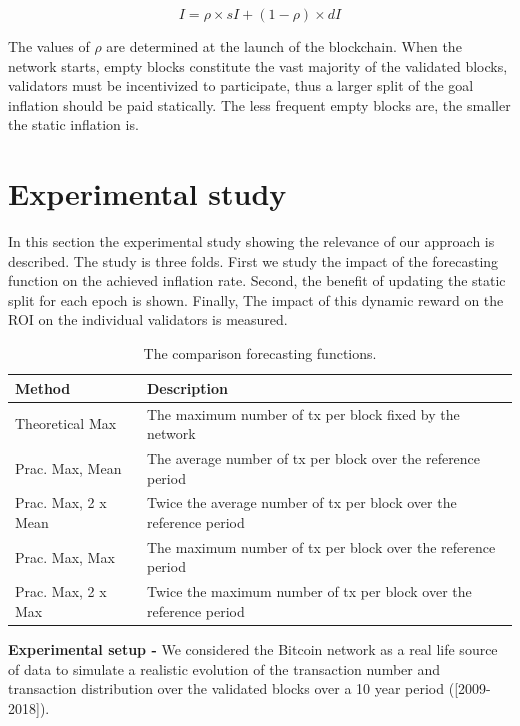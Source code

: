 \documentclass[conference]{IEEEtran}
\begin{document}
\begin{equation}
    I=\rho \times sI + (1 - \rho) \times dI
    \label{eq:inflationsplitRho}
\end{equation}

The values of $\rho$ are determined at the launch of the blockchain. When the network starts, empty blocks constitute the vast majority of the validated blocks, validators must be incentivized to participate, thus a larger split of the goal inflation should be paid statically. The less frequent empty blocks are, the smaller the static inflation is.

\section{Experimental study}
\label{sec:experiements}
In this section the experimental study showing the relevance of our approach is described. The study is three folds. First we study the impact of the forecasting function on the achieved inflation rate. Second, the benefit of updating the static split for each epoch is shown. Finally, The impact of this dynamic reward on the ROI on the individual validators is measured.

\begin{table}[t]
	\centering
    \def\arraystretch{2}
	\caption{The comparison forecasting functions.}
	\begin{tabular}{|l|l|}
		\hline
		Method & Description \\
		\hline\hline
		Theoretical Max & The maximum number of tx per block fixed by the network\\
		\hline
		Prac. Max, Mean & The average number of tx per block over the reference period  \\
		\hline
		Prac. Max, 2 x Mean & Twice the average number of tx per block over the reference period \\
		\hline
		Prac. Max, Max & The maximum number of tx per block over the reference period \\
		\hline
		Prac. Max, 2 x Max & Twice the maximum number of tx per block over the reference period \\
		\hline
	\end{tabular}
\label{tab:forecast}
\end{table}

\textbf{Experimental setup -} We considered the Bitcoin network as a real life source of data to simulate a realistic evolution of the transaction number and transaction distribution over the validated blocks over a  10 year period ([2009-2018]).
\end{document}
